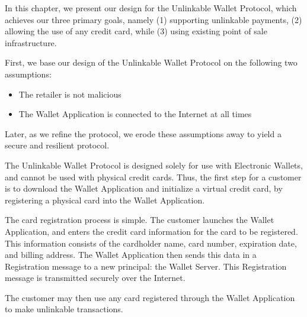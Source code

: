 In this chapter, we present our design for the Unlinkable Wallet Protocol, which achieves our three primary goals, namely
    (1) supporting unlinkable payments,
    (2) allowing the use of any credit card,
    while (3) using existing point of sale infrastructure.

First, we base our design of the Unlinkable Wallet Protocol on the following two assumptions:
\begin{itemize}
\item The retailer is not malicious
\item The Wallet Application is connected to the Internet at all times
\end{itemize}
Later, as we refine the protocol, we erode these assumptions away to yield a secure and resilient protocol.

The Unlinkable Wallet Protocol is designed solely for use with Electronic Wallets, and cannot be used with physical credit cards.
Thus, the first step for a customer is to download the Wallet Application and initialize a virtual credit card,
     by registering a physical card into the Wallet Application.

The card registration process is simple.
The customer launches the Wallet Application, and enters the credit card information for the card to be registered.
This information consists of the cardholder name, card number, expiration date, and billing address.
The Wallet Application then sends this data in a Registration message to a new principal: the Wallet Server.
This Registration message is transmitted securely over the Internet.

The customer may then use any card registered through the Wallet Application to make unlinkable transactions.
